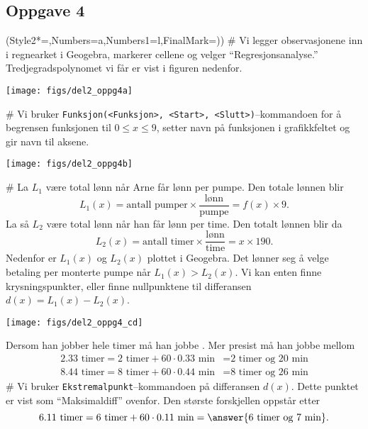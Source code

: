 \subsection*{Oppgave 4}
\begin{easylist}[enumerate]
	\ListProperties(Style2*=,Numbers=a,Numbers1=l,FinalMark={)})
	# Vi legger observasjonene inn i regnearket i Geogebra, markerer cellene og velger ``Regresjonsanalyse.'' Tredjegradspolynomet vi får er vist i figuren nedenfor.
	\begin{center}
		\texttt{[image: figs/del2\_oppg4a]}
	\end{center}
	# Vi bruker \verb|Funksjon(<Funksjon>, <Start>, <Slutt>)|--kommandoen
	for å begrensen funksjonen til $0 \leq x \leq 9$, setter navn på funksjonen i grafikkfeltet og gir navn til aksene.
	\begin{center}
		\texttt{[image: figs/del2\_oppg4b]}
	\end{center}
	# La $L_1$ være total lønn når Arne får lønn per pumpe. Den totale lønnen blir
	\begin{equation*}
		L_1(x) = \text{antall pumper} \times \frac{\text{lønn}}{\text{pumpe}}
		= f(x) \times 9.
	\end{equation*}
	La så $L_2$ være total lønn når han får lønn per time. Den totalt lønnen blir da 
	\begin{equation*}
	L_2(x) = \text{antall timer} \times \frac{\text{lønn}}{\text{time}}
	= x \times 190.
	\end{equation*}
	Nedenfor er $L_1(x)$ og $L_2(x)$ plottet i Geogebra. Det lønner seg å velge betaling per monterte pumpe når $L_1(x) > L_2(x)$.
	Vi kan enten finne krysningspunkter, eller finne nullpunktene til differansen $d(x) = L_1(x) - L_2(x)$.
	\begin{center}
		\texttt{[image: figs/del2\_oppg4\_cd]}
	\end{center}
	Dersom han jobber hele timer må han jobbe .
	Mer presist må han jobbe mellom
	\begin{align*}
		2.33 \text{ timer} = 2 \text{ timer} +  60 \cdot 0.33 \text{ min} &= \text{2 timer og 20 min} \\
		8.44 \text{ timer} = 8 \text{ timer} +  60 \cdot 0.44 \text{ min} &= \text{8 timer og 26 min}
	\end{align*}
	# Vi bruker \verb|Ekstremalpunkt|--kommandoen på differansen $d(x)$. Dette punktet er vist som  ``Maksimaldiff'' ovenfor. Den største forskjellen oppstår etter
	\begin{equation*}
		6.11 \text{ timer} = 6 \text{ timer} +  60 \cdot 0.11 \text{ min} = \answer{\text{6 timer og 7 min}}.
	\end{equation*}
\end{easylist}




